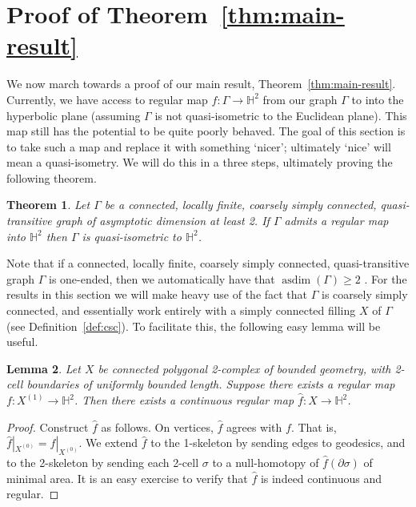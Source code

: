 \documentclass[11pt,a4paper]{amsart}
\newtheorem{theorem}{Theorem}[section]%
\newtheorem{lemma}[theorem]{Lemma}
\theoremstyle{definition}
\begin{document}







\section{Proof of Theorem~\ref{thm:main-result}}

We now march towards a proof of our main result, Theorem~\ref{thm:main-result}. Currently, we have access to regular map $f : \Gamma \to \mathbb H^2$ from our graph $\Gamma$ to into the hyperbolic plane (assuming $\Gamma$ is not quasi-isometric to the Euclidean plane). This map still has the potential to be quite poorly behaved. The goal of this section is to take such a map and replace it with something `nicer'; ultimately `nice' will mean a quasi-isometry. We will do this in a three steps, ultimately proving the following theorem.

\begin{theorem}\label{thm:upgrading-reg-to-qi}
    Let $\Gamma$ be a connected, locally finite,  coarsely simply connected, quasi-transitive graph of asymptotic dimension at least 2.
    If $\Gamma$ admits a regular map into $\mathbb{H}^2$ then $\Gamma$ is quasi-isometric to $\mathbb{H}^2$.
\end{theorem}

Note that if a connected, locally finite,  coarsely simply connected, quasi-transitive graph $\Gamma$ is one-ended, then we automatically have that $\operatorname{asdim}(\Gamma) \geq 2$ \cite{fujiwara2007note}.
For the results in this section we will make heavy use of the fact that $\Gamma$ is coarsely simply connected, and essentially work entirely with a simply connected filling $X$ of $\Gamma$ (see Definition~\ref{def:csc}).
To facilitate this, the following easy lemma will be useful.


\begin{lemma}\label{lem:cts-extension}
    Let $X$ be connected polygonal 2-complex of bounded geometry, with 2-cell boundaries of uniformly bounded length.  Suppose there exists a regular map $f : X^{(1)} \to \mathbb H^2$. Then there exists a continuous regular map $\widehat f : X \to \mathbb H^2$. 
\end{lemma}

\begin{proof}
    Construct $\widehat f$ as follows. On vertices, $\widehat f$ agrees with $f$. That is, $\widehat f|_{X^{(0)}} = f|_{X^{(0)}}$. We extend $\widehat f$ to the 1-skeleton by sending edges to geodesics, and to the 2-skeleton by sending each 2-cell $\sigma$ to a null-homotopy of $\widehat f(\partial \sigma)$ of minimal area. It is an easy exercise to verify that $\widehat f$ is indeed continuous and regular.
\end{proof}
\end{document}
